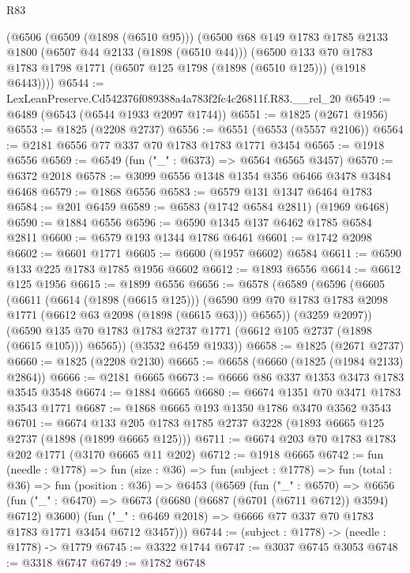 \begin{lexlean}{R83}
\begin{coremodule}
    (@6506
      (@6509 (@1898 (@6510 @95)))
      (@6500
        @68
        @149
        @1783
        @1785
        @2133
        @1800
        (@6507 @44 @2133 (@1898 (@6510 @44)))
        (@6500
          @133
          @70
          @1783
          @1783
          @1798
          @1771
          (@6507 @125 @1798 (@1898 (@6510 @125)))
          (@1918 @6443))))
@6544 := LexLeanPreserve.Cd542376f089388a4a783f2fc4c26811f.R83.__rel_20
@6549 := @6489 (@6543 (@6544 @1933 @2097 @1744))
@6551 := @1825 (@2671 @1956)
@6553 := @1825 (@2208 @2737)
@6556 := @6551 (@6553 (@5557 @2106))
@6564 := @2181 @6556 @77 @337 @70 @1783 @1783 @1771 @3454
@6565 := @1918 @6556
@6569 := @6549 (fun ("_" : @6373) => @6564 @6565 @3457)
@6570 := @6372 @2018
@6578 := @3099 @6556 @1348 @1354 @356 @6466 @3478 @3484 @6468
@6579 := @1868 @6556
@6583 := @6579 @131 @1347 @6464 @1783
@6584 := @201 @6459
@6589 := @6583 (@1742 @6584 @2811) (@1969 @6468)
@6590 := @1884 @6556
@6596 := @6590 @1345 @137 @6462 @1785 @6584 @2811
@6600 := @6579 @193 @1344 @1786 @6461
@6601 := @1742 @2098
@6602 := @6601 @1771
@6605 := @6600 (@1957 @6602) @6584
@6611 := @6590 @133 @225 @1783 @1785 @1956 @6602
@6612 := @1893 @6556
@6614 := @6612 @125 @1956
@6615 := @1899 @6556
@6656 := @6578
    (@6589
      (@6596
        (@6605
          (@6611
            (@6614 (@1898 (@6615 @125)))
            (@6590 @99 @70 @1783 @1783 @2098 @1771 (@6612 @63 @2098 (@1898 (@6615 @63))) @6565))
          (@3259 @2097))
        (@6590 @135 @70 @1783 @1783 @2737 @1771 (@6612 @105 @2737 (@1898 (@6615 @105))) @6565))
      (@3532 @6459 @1933))
@6658 := @1825 (@2671 @2737)
@6660 := @1825 (@2208 @2130)
@6665 := @6658 (@6660 (@1825 (@1984 @2133) @2864))
@6666 := @2181 @6665
@6673 := @6666 @86 @337 @1353 @3473 @1783 @3545 @3548
@6674 := @1884 @6665
@6680 := @6674 @1351 @70 @3471 @1783 @3543 @1771
@6687 := @1868 @6665 @193 @1350 @1786 @3470 @3562 @3543
@6701 := @6674 @133 @205 @1783 @1785 @2737 @3228 (@1893 @6665 @125 @2737 (@1898 (@1899 @6665 @125)))
@6711 := @6674 @203 @70 @1783 @1783 @202 @1771 (@3170 @6665 @11 @202)
@6712 := @1918 @6665
@6742 := fun (needle : @1778) =>
  fun (size : @36) =>
  fun (subject : @1778) =>
  fun (total : @36) =>
  fun (position : @36) =>
  @6453
    (@6569
      (fun ("_" : @6570) =>
      @6656
        (fun ("_" : @6470) => @6673 (@6680 (@6687 (@6701 (@6711 @6712)) @3594) @6712) @3600)
        (fun ("_" : @6469 @2018) => @6666 @77 @337 @70 @1783 @1783 @1771 @3454 @6712 @3457)))
@6744 := (subject : @1778) -> (needle : @1778) -> @1779
@6745 := @3322 @1744
@6747 := @3037 @6745 @3053
@6748 := @3318 @6747
@6749 := @1782 @6748

\end{coremodule}
\end{lexlean}
